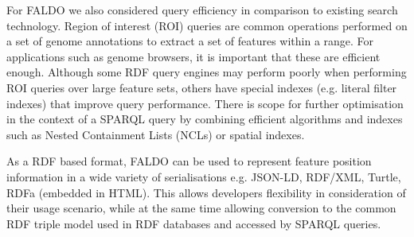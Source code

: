 For FALDO we also considered query efficiency in comparison to existing search technology. 
Region of interest (ROI) queries are common operations performed on a
set of genome annotations to extract a set of features within a range.
For applications such as genome browsers, it is important that these are efficient enough.
Although some RDF query engines may perform poorly when performing ROI queries over large feature sets,
others have special indexes (e.g. literal filter indexes) that improve query performance.
There is scope for further optimisation in the context of a SPARQL query by combining
efficient algorithms and indexes such as Nested Containment Lists (NCLs) \cite{NCL2007}
or spatial indexes.



As a RDF based format, FALDO can be used to represent feature position information in
a wide variety of serialisations e.g. JSON-LD, RDF/XML, Turtle, RDFa (embedded in HTML).
This allows developers flexibility in consideration of their usage scenario, while at the same time
allowing conversion to the common RDF triple model used in RDF databases and accessed by SPARQL queries.
